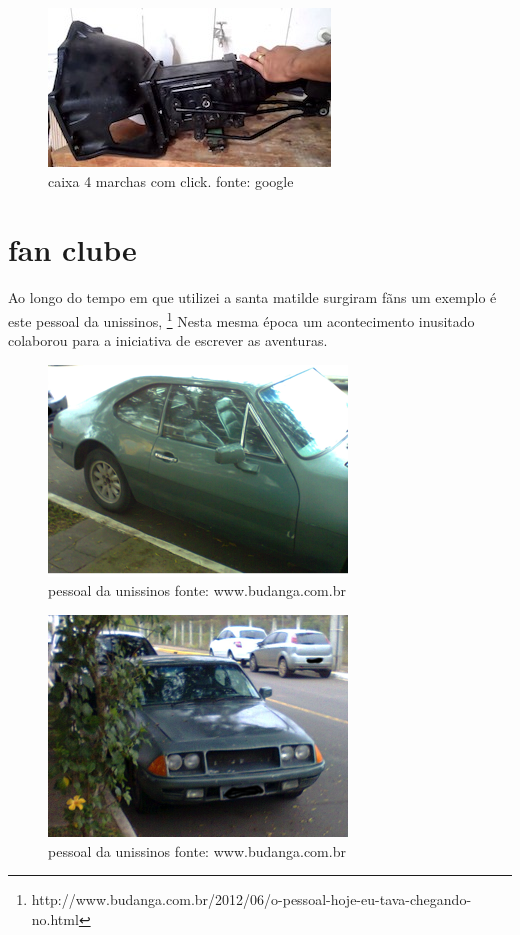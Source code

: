 \documentclass[a4paper]{report}
\begin{document}
\begin{figure}[!htb]
\centering
\includegraphics{caixa4}
\caption{caixa 4 marchas com click. fonte: google}
\label{4 marchas opala varetada}
\end{figure}
\clearpage


\section*{fan clube}

Ao longo do tempo em que utilizei a santa matilde surgiram f\~ans um exemplo \'e este pessoal da unissinos, \footnote{http://www.budanga.com.br/2012/06/o-pessoal-hoje-eu-tava-chegando-no.html} 
Nesta mesma \'epoca um acontecimento inusitado colaborou para a iniciativa de escrever as aventuras.

\begin{figure}[!htb]
\centering
\includegraphics{Foto0296}
\caption{pessoal da unissinos fonte: www.budanga.com.br}
\label{fan clube SL }
\end{figure}


\begin{figure}[!htb]
\centering
\includegraphics{Foto0295}
\caption{pessoal da unissinos fonte: www.budanga.com.br}
\label{Blog do pessoal da Tecnosinos }
\end{figure}
\clearpage
\end{document}
